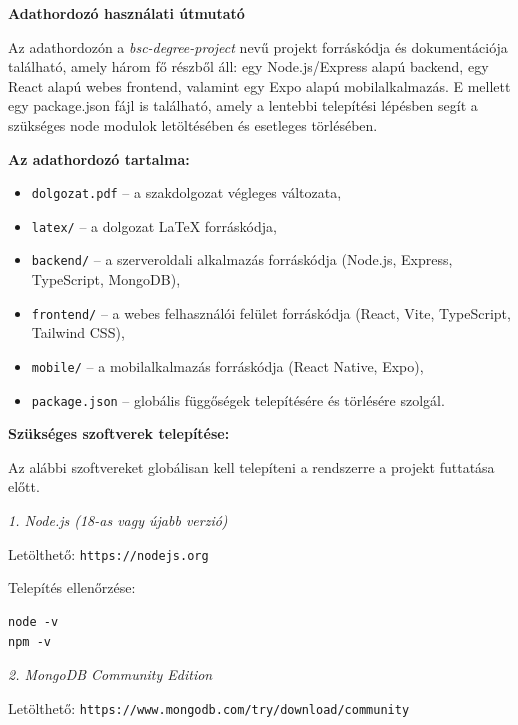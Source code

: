\pagestyle{empty}

\noindent \textbf{\Large Adathordozó használati útmutató}

\vskip 1cm

Az adathordozón a \textit{bsc-degree-project} nevű projekt forráskódja és dokumentációja található, amely három fő részből áll: egy Node.js/Express alapú backend, egy React alapú webes frontend, valamint egy Expo alapú mobilalkalmazás. E mellett egy package.json fájl is található, amely a lentebbi telepítési lépésben segít a szükséges node modulok letöltésében és esetleges törlésében.

\vskip 0.5cm

\noindent \textbf{Az adathordozó tartalma:}

\begin{itemize}
    \item \texttt{dolgozat.pdf} -- a szakdolgozat végleges változata,
    \item \texttt{latex/} -- a dolgozat \LaTeX{} forráskódja,
    \item \texttt{backend/} -- a szerveroldali alkalmazás forráskódja (Node.js, Express, TypeScript, MongoDB),
    \item \texttt{frontend/} -- a webes felhasználói felület forráskódja (React, Vite, TypeScript, Tailwind CSS),
    \item \texttt{mobile/} -- a mobilalkalmazás forráskódja (React Native, Expo),
    \item \texttt{package.json} -- globális függőségek telepítésére és törlésére szolgál.
\end{itemize}

\vskip 0.5cm

\noindent \textbf{Szükséges szoftverek telepítése:}

Az alábbi szoftvereket globálisan kell telepíteni a rendszerre a projekt futtatása előtt.

\vskip 0.3cm

\noindent \textit{1. Node.js (18-as vagy újabb verzió)}

\noindent Letölthető: \texttt{https://nodejs.org}

\noindent Telepítés ellenőrzése:
\begin{verbatim}
node -v
npm -v
\end{verbatim}

\noindent \textit{2. MongoDB Community Edition}

\noindent Letölthető: \texttt{https://www.mongodb.com/try/download/community}

